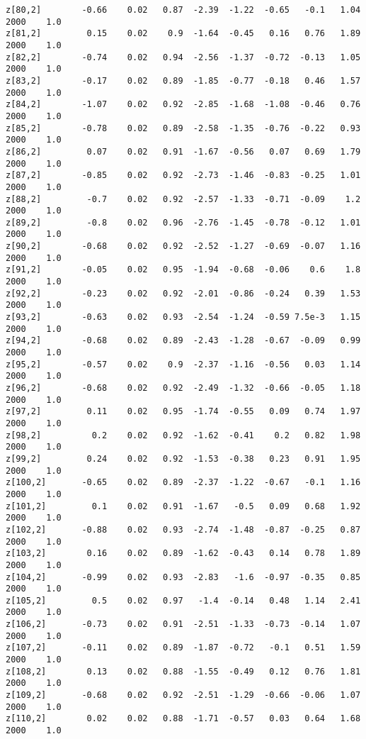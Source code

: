 \documentclass[11pt]{article}
\begin{document}
\begin{Verbatim}[commandchars=\\\{\}]
z[80,2]        -0.66    0.02   0.87  -2.39  -1.22  -0.65   -0.1   1.04   2000    1.0
z[81,2]         0.15    0.02    0.9  -1.64  -0.45   0.16   0.76   1.89   2000    1.0
z[82,2]        -0.74    0.02   0.94  -2.56  -1.37  -0.72  -0.13   1.05   2000    1.0
z[83,2]        -0.17    0.02   0.89  -1.85  -0.77  -0.18   0.46   1.57   2000    1.0
z[84,2]        -1.07    0.02   0.92  -2.85  -1.68  -1.08  -0.46   0.76   2000    1.0
z[85,2]        -0.78    0.02   0.89  -2.58  -1.35  -0.76  -0.22   0.93   2000    1.0
z[86,2]         0.07    0.02   0.91  -1.67  -0.56   0.07   0.69   1.79   2000    1.0
z[87,2]        -0.85    0.02   0.92  -2.73  -1.46  -0.83  -0.25   1.01   2000    1.0
z[88,2]         -0.7    0.02   0.92  -2.57  -1.33  -0.71  -0.09    1.2   2000    1.0
z[89,2]         -0.8    0.02   0.96  -2.76  -1.45  -0.78  -0.12   1.01   2000    1.0
z[90,2]        -0.68    0.02   0.92  -2.52  -1.27  -0.69  -0.07   1.16   2000    1.0
z[91,2]        -0.05    0.02   0.95  -1.94  -0.68  -0.06    0.6    1.8   2000    1.0
z[92,2]        -0.23    0.02   0.92  -2.01  -0.86  -0.24   0.39   1.53   2000    1.0
z[93,2]        -0.63    0.02   0.93  -2.54  -1.24  -0.59 7.5e-3   1.15   2000    1.0
z[94,2]        -0.68    0.02   0.89  -2.43  -1.28  -0.67  -0.09   0.99   2000    1.0
z[95,2]        -0.57    0.02    0.9  -2.37  -1.16  -0.56   0.03   1.14   2000    1.0
z[96,2]        -0.68    0.02   0.92  -2.49  -1.32  -0.66  -0.05   1.18   2000    1.0
z[97,2]         0.11    0.02   0.95  -1.74  -0.55   0.09   0.74   1.97   2000    1.0
z[98,2]          0.2    0.02   0.92  -1.62  -0.41    0.2   0.82   1.98   2000    1.0
z[99,2]         0.24    0.02   0.92  -1.53  -0.38   0.23   0.91   1.95   2000    1.0
z[100,2]       -0.65    0.02   0.89  -2.37  -1.22  -0.67   -0.1   1.16   2000    1.0
z[101,2]         0.1    0.02   0.91  -1.67   -0.5   0.09   0.68   1.92   2000    1.0
z[102,2]       -0.88    0.02   0.93  -2.74  -1.48  -0.87  -0.25   0.87   2000    1.0
z[103,2]        0.16    0.02   0.89  -1.62  -0.43   0.14   0.78   1.89   2000    1.0
z[104,2]       -0.99    0.02   0.93  -2.83   -1.6  -0.97  -0.35   0.85   2000    1.0
z[105,2]         0.5    0.02   0.97   -1.4  -0.14   0.48   1.14   2.41   2000    1.0
z[106,2]       -0.73    0.02   0.91  -2.51  -1.33  -0.73  -0.14   1.07   2000    1.0
z[107,2]       -0.11    0.02   0.89  -1.87  -0.72   -0.1   0.51   1.59   2000    1.0
z[108,2]        0.13    0.02   0.88  -1.55  -0.49   0.12   0.76   1.81   2000    1.0
z[109,2]       -0.68    0.02   0.92  -2.51  -1.29  -0.66  -0.06   1.07   2000    1.0
z[110,2]        0.02    0.02   0.88  -1.71  -0.57   0.03   0.64   1.68   2000    1.0

\end{Verbatim}
\end{document}
